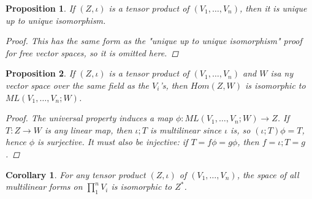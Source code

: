 \documentclass[a4paper,14pt]{article}
\newtheorem*{prop}{Proposition}
\newtheorem*{corollary}{Corollary}
\begin{document}
\begin{prop}
If $(Z, \iota)$ is a tensor product of $(V_1, \ldots, V_n)$, then it is unique up to unique isomorphism.
\begin{proof}
This has the same form as the "unique up to unique isomorphism" proof for free vector spaces, so it is omitted here.
\end{proof}
\end{prop}

\begin{prop}
If $(Z, \iota)$ is a tensor product of $(V_1, \ldots, V_n)$ and $W$ isa ny vector space over the same field as the $V_i$'s, then $Hom(Z, W)$ is isomorphic to $ML(V_1, \ldots, V_n; W)$.
\begin{proof}
    The universal property induces a map $\phi: ML(V_1, \ldots, V_n; W) \to Z$. If $T: Z \to W$ is any linear map, then $\iota;T$ is multilinear since $\iota$ is, so $(\iota;T) \phi = T$, hence $\phi$ is surjective. It must also be injective: if $T = f \phi = g \phi$, then $f = \iota;T = g$.
\end{proof}
\end{prop}
\begin{corollary}
For any tensor product $(Z, \iota)$ of $(V_1, \ldots, V_n)$, the space of all multilinear forms on $\prod_1^n V_i$ is isomorphic to $Z^{\ast}$.
\end{corollary}
\end{document}
